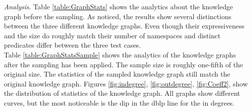 \documentclass[11pt,letterpaper ,oneside ]{book}
\begin{document}
	\textit{Analysis}. Table \ref{table:GraphStats} shows the analytics about the knowledge graph before the sampling. As noticed, the results show several distinctions between the three different knowledge graphs. Even though their expressiveness and the size do roughly match their number of namespaces and distinct predicates differ between the three test cases.\\
	Table \ref{table:GraphStatsSample} shows the analytics of the knowledge graphs after the sampling has been applied. The sample size is roughly one-fifth of the original size. The statistics of the sampled knowledge graph still match the original knowledge graph.
	Figures \ref{fig:indegree},  \ref{fig:outdegree},  \ref{fig:Coeff2}, show the distribution of statistics of the knowledge graph. All graphs show different curves, but the most noticeable is the dip in the dblp line for the in degrees. 
		\begin{figure}[ht]
	\end{figure}
\end{document}
